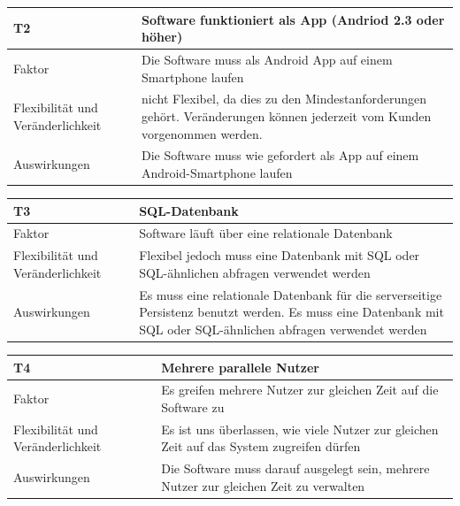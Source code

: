 \documentclass[fontsize=12pt,paper=a4,twoside]{scrartcl}
\begin{document}
\begin{table}[H]
\begin{tabular}{|p{3cm}|p{12cm}|}\hline
T2 & Software funktioniert als App (Andriod 2.3 oder höher) \\ \hline
Faktor & Die Software muss als Android App auf einem Smartphone laufen\\ \hline
Flexibilität und Veränderlichkeit & nicht Flexibel, da dies zu den Mindestanforderungen gehört. Veränderungen können jederzeit vom Kunden vorgenommen werden.  \\ \hline
Auswirkungen & Die Software muss wie gefordert als App auf einem Android-Smartphone laufen\\ \hline
\end{tabular}
\end{table}


\begin{table}[H]
\begin{tabular}{|p{3cm}|p{12cm}|}\hline
T3 & SQL-Datenbank \\ \hline
Faktor & Software läuft über eine relationale Datenbank\\ \hline
Flexibilität und Veränderlichkeit & Flexibel jedoch muss eine Datenbank mit SQL oder SQL-ähnlichen abfragen verwendet werden  \\ \hline
Auswirkungen & Es muss eine relationale Datenbank für die serverseitige Persistenz benutzt werden. Es muss eine Datenbank mit SQL oder SQL-ähnlichen abfragen verwendet werden\\ \hline
\end{tabular}
\end{table}

\begin{table}[H]
\begin{tabular}{|p{3cm}|p{12cm}|}\hline
T4 & Mehrere parallele Nutzer \\ \hline
Faktor & Es greifen mehrere Nutzer zur gleichen Zeit auf die Software zu\\ \hline
Flexibilität und Veränderlichkeit & Es ist uns überlassen, wie viele Nutzer zur gleichen Zeit auf das System zugreifen dürfen  \\ \hline
Auswirkungen & Die Software muss darauf ausgelegt sein, mehrere Nutzer zur gleichen Zeit zu verwalten\\ \hline
\end{tabular}
\end{table}
\end{document}
